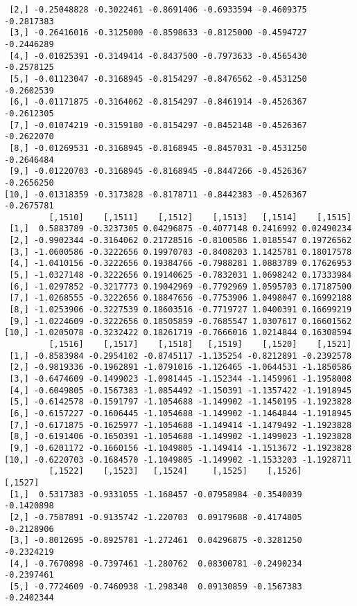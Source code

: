 \documentclass[
  letterpaper,
  DIV=11,
  numbers=noendperiod]{scrreprt}
\begin{document}
\begin{verbatim}
 [2,] -0.25048828 -0.3022461 -0.8691406 -0.6933594 -0.4609375 -0.2817383
 [3,] -0.26416016 -0.3125000 -0.8598633 -0.8125000 -0.4594727 -0.2446289
 [4,] -0.01025391 -0.3149414 -0.8437500 -0.7973633 -0.4565430 -0.2578125
 [5,] -0.01123047 -0.3168945 -0.8154297 -0.8476562 -0.4531250 -0.2602539
 [6,] -0.01171875 -0.3164062 -0.8154297 -0.8461914 -0.4526367 -0.2612305
 [7,] -0.01074219 -0.3159180 -0.8154297 -0.8452148 -0.4526367 -0.2622070
 [8,] -0.01269531 -0.3168945 -0.8168945 -0.8457031 -0.4531250 -0.2646484
 [9,] -0.01220703 -0.3168945 -0.8168945 -0.8447266 -0.4526367 -0.2656250
[10,] -0.01318359 -0.3173828 -0.8178711 -0.8442383 -0.4526367 -0.2675781
         [,1510]    [,1511]    [,1512]    [,1513]   [,1514]    [,1515]
 [1,]  0.5883789 -0.3237305 0.04296875 -0.4077148 0.2416992 0.02490234
 [2,] -0.9902344 -0.3164062 0.21728516 -0.8100586 1.0185547 0.19726562
 [3,] -1.0600586 -0.3222656 0.19970703 -0.8408203 1.1425781 0.18017578
 [4,] -1.0410156 -0.3222656 0.19384766 -0.7988281 1.0883789 0.17626953
 [5,] -1.0327148 -0.3222656 0.19140625 -0.7832031 1.0698242 0.17333984
 [6,] -1.0297852 -0.3217773 0.19042969 -0.7792969 1.0595703 0.17187500
 [7,] -1.0268555 -0.3222656 0.18847656 -0.7753906 1.0498047 0.16992188
 [8,] -1.0253906 -0.3227539 0.18603516 -0.7719727 1.0400391 0.16699219
 [9,] -1.0224609 -0.3222656 0.18505859 -0.7685547 1.0307617 0.16601562
[10,] -1.0205078 -0.3232422 0.18261719 -0.7666016 1.0214844 0.16308594
         [,1516]    [,1517]    [,1518]   [,1519]    [,1520]    [,1521]
 [1,] -0.8583984 -0.2954102 -0.8745117 -1.135254 -0.8212891 -0.2392578
 [2,] -0.9819336 -0.1962891 -1.0791016 -1.126465 -1.0644531 -1.1850586
 [3,] -0.6474609 -0.1499023 -1.0981445 -1.152344 -1.1459961 -1.1958008
 [4,] -0.6049805 -0.1567383 -1.0854492 -1.150391 -1.1357422 -1.1918945
 [5,] -0.6142578 -0.1591797 -1.1054688 -1.149902 -1.1450195 -1.1923828
 [6,] -0.6157227 -0.1606445 -1.1054688 -1.149902 -1.1464844 -1.1918945
 [7,] -0.6171875 -0.1625977 -1.1054688 -1.149414 -1.1479492 -1.1923828
 [8,] -0.6191406 -0.1650391 -1.1054688 -1.149902 -1.1499023 -1.1923828
 [9,] -0.6201172 -0.1660156 -1.1049805 -1.149414 -1.1513672 -1.1923828
[10,] -0.6220703 -0.1684570 -1.1049805 -1.149902 -1.1533203 -1.1928711
         [,1522]    [,1523]   [,1524]     [,1525]    [,1526]    [,1527]
 [1,]  0.5317383 -0.9331055 -1.168457 -0.07958984 -0.3540039 -0.1420898
 [2,] -0.7587891 -0.9135742 -1.220703  0.09179688 -0.4174805 -0.2128906
 [3,] -0.8012695 -0.8925781 -1.272461  0.04296875 -0.3281250 -0.2324219
 [4,] -0.7670898 -0.7397461 -1.280762  0.08300781 -0.2490234 -0.2397461
 [5,] -0.7724609 -0.7460938 -1.298340  0.09130859 -0.1567383 -0.2402344

\end{verbatim}
\end{document}
